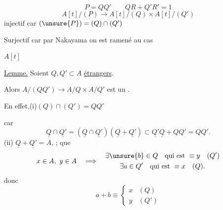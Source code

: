 \[
P=QQ'\qquad QR+Q'R'=1
\]
\[
A[t]/(P)\longrightarrow A[t]/(Q)\times A[t]/(Q')
\]
injectif car $(\unsure{P})=(Q)\cap(Q')$

Surjectif car par Nakayama on est ramené au cas

$A[t]$

\uline{Lemme.} Soient $Q,Q'\subset A$ \uline{ étrangers}.

Alors $A/(QQ')\longrightarrow A/Q\times A/Q'$ est un .

En effet,\quad (i)\quad $(Q)\cap(Q')=QQ'$

car
\[
\underline Q\cap\underline {Q'}=(\underline Q\cap\underline {Q'})(\underline Q+\underline {Q'})
\subset\underline {Q'}\underline Q+QQ'=QQ'.
\]
(ii) $\underline Q+\underline {Q'}=A$, ;  que
\[
x\in A,\ y\in A\quad\Longrightarrow\quad
\begin{gathered}
\exists\unsure{b}\in Q\quad\text{qui est }\equiv y\quad(Q')\\
\exists a\in Q'\quad\text{qui est }\equiv x\quad(Q).
\end{gathered}
\]
donc
\[
a+b\equiv\begin{cases}x&(Q)\\y&(Q')\end{cases}
\]

